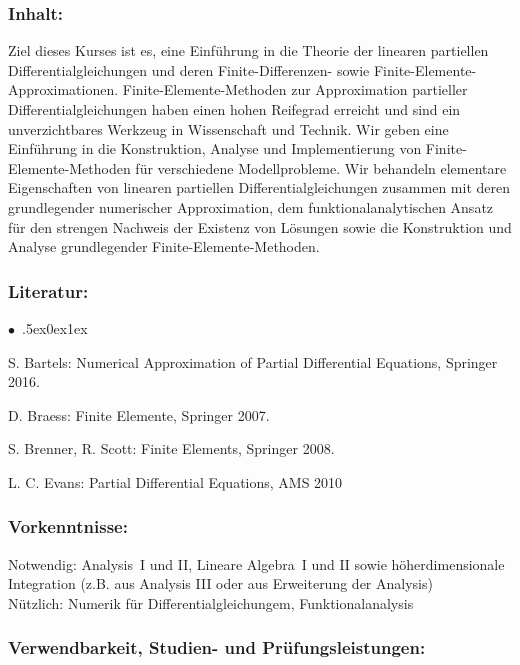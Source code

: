 \documentclass[a4paper,10pt]{article}
\renewenvironment{itemize}{\begin{list}{$\bullet$\ }{\itemsep.5ex\setlength{\topsep}{0.5\itemsep}\parsep0ex\labelsep1ex\settowidth{\labelwidth}{$\bullet$\ }\setlength{\leftmargin}{\labelwidth}\addtolength{\leftmargin}{3ex}\addtolength{\leftmargin}{\labelsep}}}{\end{list}}
\begin{document}
\subsubsection*{\large
    Inhalt:
}
Ziel dieses Kurses ist es, eine Einführung in die Theorie der linearen partiellen Differentialgleichungen und deren Finite-Differenzen- sowie Finite-Elemente-Approximationen. Finite-Elemente-Methoden zur Approximation partieller Differentialgleichungen haben einen hohen Reifegrad erreicht und sind ein unverzichtbares Werkzeug in Wissenschaft und Technik. Wir geben eine Einführung in die Konstruktion, Analyse und Implementierung von Finite-Elemente-Methoden für verschiedene Modellprobleme. Wir behandeln elementare Eigenschaften von linearen partiellen Differentialgleichungen zusammen mit deren grundlegender numerischer Approximation, dem funktionalanalytischen Ansatz für den strengen Nachweis der Existenz von Lösungen sowie die Konstruktion und Analyse grundlegender Finite-Elemente-Methoden.
\subsubsection*{\large
    Literatur:
}
\begin{itemize}
\item  S. Bartels: Numerical Approximation of Partial Differential Equations, Springer 2016. 
\item  D. Braess: Finite Elemente, Springer 2007. 
\item  S. Brenner, R. Scott: Finite Elements, Springer 2008. 
\item  L. C. Evans: Partial Differential Equations, AMS 2010
\end{itemize}
\subsubsection*{\large
    Vorkenntnisse:
}
Notwendig:  Analysis~I und II, Lineare Algebra~I und II sowie höherdimensionale Integration (z.B. aus Analysis III oder aus Erweiterung der Analysis) \\
Nützlich: Numerik für Differentialgleichungem, Funktionalanalysis 
\cleardoublepage
\subsubsection*{\large
    Verwendbarkeit, Studien- und Prüfungsleistungen:
}
\end{document}
